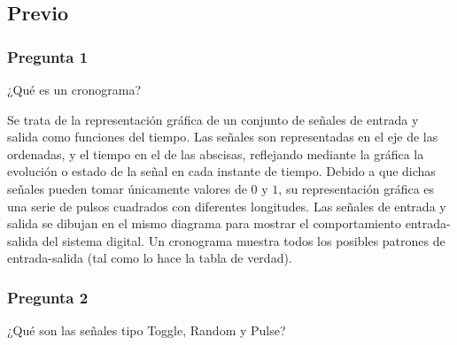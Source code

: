 \documentclass[../procedimientos.tex]{subfiles}
\begin{document}
\subsection{Previo}
\subsubsection*{Pregunta 1}
\begin{em}
  ¿Qué es un cronograma?
\end{em}

Se trata de la representación gráfica de un conjunto de señales de entrada y 
salida como funciones del tiempo. Las señales son representadas en el eje de 
las ordenadas, y el tiempo en el de las abscisas, reflejando mediante la 
gráfica la evolución o estado de la señal en cada instante de tiempo. Debido a 
que dichas señales pueden tomar únicamente valores de $0$ y $1$, su 
representación gráfica es una serie de pulsos cuadrados con diferentes 
longitudes. Las señales de entrada y salida se dibujan en el mismo diagrama 
para mostrar el comportamiento entrada-salida del sistema digital. Un 
cronograma muestra todos los posibles patrones de entrada-salida (tal como lo 
hace la tabla de verdad).

\subsubsection*{Pregunta 2}
\begin{em}
  ¿Qué son las señales tipo Toggle, Random y Pulse?
\end{em}
\end{document}
